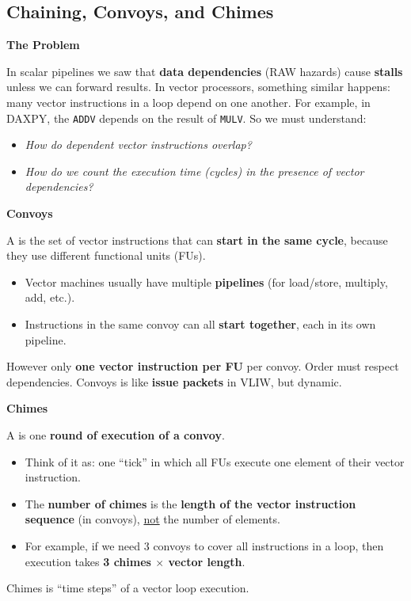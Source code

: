 \subsection{Chaining, Convoys, and Chimes}

\begin{flushleft}
    \textcolor{Red2}{ \textbf{The Problem}}
\end{flushleft}
In scalar pipelines we saw that \textbf{data dependencies} (RAW hazards) cause \textbf{stalls} unless we can forward results. In vector processors, something similar happens: many vector instructions in a loop depend on one another. For example, in DAXPY, the \texttt{ADDV} depends on the result of \texttt{MULV}. So we must understand:
\begin{itemize}
    \item \emph{How do dependent vector instructions overlap?}
    \item \emph{How do we count the execution time (cycles) in the presence of vector dependencies?}
\end{itemize}

\highspace
\begin{flushleft}
    \textcolor{Green3}{ \textbf{Convoys}}
\end{flushleft}
A  is the set of vector instructions that can \textbf{start in the same cycle}, because they use different functional units (FUs).
\begin{itemize}
    \item Vector machines usually have multiple \textbf{pipelines} (for load/store, multiply, add, etc.).
    \item Instructions in the same convoy can all \textbf{start together}, each in its own pipeline.
\end{itemize}
However only \textbf{one vector instruction per FU} per convoy. Order must respect dependencies. Convoys is like \textbf{issue packets} in VLIW, but dynamic.

\highspace
\begin{flushleft}
    \textcolor{Green3}{ \textbf{Chimes}}
\end{flushleft}
A  is one \textbf{round of execution of a convoy}.
\begin{itemize}
    \item Think of it as: one ``tick'' in which all FUs execute one element of their vector instruction.
    \item The \textbf{number of chimes} is the \textbf{length of the vector instruction sequence} (in convoys), \underline{not} the number of elements.
    \item For example, if we need 3 convoys to cover all instructions in a loop, then execution takes \textbf{3 chimes $\times$ vector length}.
\end{itemize}
Chimes is ``time steps'' of a vector loop execution.

